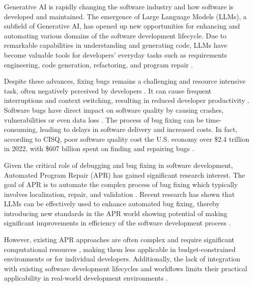 Generative AI is rapidly changing the software industry and how software is developed and maintained. The emergence of Large Language Models (LLMs), a subfield of Generative AI, has opened up new opportunities for enhancing and automating various domains of the software development lifecycle. Due to remarkable capabilities in understanding and generating code, LLMs have become valuable tools for developers' everyday tasks such as requirements engineering, code generation, refactoring, and program repair \cite{houLargeLanguageModels2024, puvvadiCodingAgentsComprehensive2025}.

Despite these advances, fixing bugs remains a challenging and resource intensive task, often negatively perceived by developers  \cite{winterHowDevelopersReally2023}. It can cause frequent interruptions and context switching, resulting in reduced developer productivity  \cite{vasilescuSkyNotLimit2016}.
Software bugs have direct impact on software quality by causing crashes, vulnerabilities or even data loss \cite{tihanyiNewEraSoftware2024}.
The process of bug fixing can be time-consuming, leading to delays in software delivery and increased costs. %
In fact, according to CISQ, poor software quality cost the U.S. economy over \$2.4 trillion in 2022, with \$607 billion spent on finding and repairing bugs \cite{CostPoorSoftware}.

Given the critical role of debugging and bug fixing in software development, Automated Program Repair (APR) has gained significant research interest. The goal of APR is to automate the complex process of bug fixing \cite{houLargeLanguageModels2024} which typically involves localization, repair, and validation \cite{zhangEmpiricalStudyFactors2012, leeUnifiedDebuggingApproach2024,xiaAgentlessDemystifyingLLMbased2024,zhangPATCHEmpoweringLarge2025, wangEmpiricalResearchUtilizing2025}.
Recent research has shown that LLMs can be effectively used to enhance automated bug fixing, thereby introducing new standards in the APR world showing potential of making significant improvements in efficiency of the software development process \cite{xiaAgentlessDemystifyingLLMbased2024,liuMarsCodeAgentAInative2024,yangSWEagentAgentComputerInterfaces2024, sobaniaAnalysisAutomaticBug2023, xiaAutomatedProgramRepair2024, huCanGPTO1Kill2024}.

However, existing APR approaches are often complex and require significant computational resources \cite{rondonEvaluatingAgentbasedProgram2025}, making them less applicable in budget-constrained environments or for individual developers. Additionally, the lack of integration with existing software development lifecycles and workflows limits their practical applicability in real-world development environments \cite{chenUnveilingPitfallsUnderstanding2025,liuMarsCodeAgentAInative2024}.

